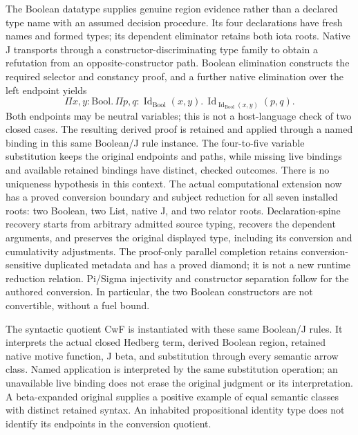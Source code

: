 \documentclass[11pt]{article}
\theoremstyle{definition}
\theoremstyle{remark}
\begin{document}
The Boolean datatype supplies genuine region evidence rather than a declared
type name with an assumed decision procedure. Its four declarations have fresh
names and formed types; its dependent eliminator retains both iota roots.
Native J transports through a constructor-discriminating type family to obtain
a refutation from an opposite-constructor path. Boolean elimination constructs
the required selector and constancy proof, and a further native elimination
over the left endpoint yields
\[
  \Pi x,y:\mathrm{Bool}.\,
  \Pi p,q:\operatorname{Id}_{\mathrm{Bool}}(x,y).\,
  \operatorname{Id}_{\operatorname{Id}_{\mathrm{Bool}}(x,y)}(p,q).
\]
Both endpoints may be neutral variables; this is not a host-language check
of two closed cases. The resulting derived proof is retained and applied
through a named binding in this same Boolean/J rule instance. The four-to-five
variable substitution keeps the original endpoints and paths, while missing
live bindings and available retained bindings have distinct, checked outcomes.
There is no uniqueness hypothesis in this context. The actual computational
extension now has a proved conversion boundary and subject reduction for all
seven installed roots: two Boolean, two List, native J, and two relator roots.
Declaration-spine recovery starts from arbitrary admitted source typing,
recovers the dependent arguments, and preserves the original displayed type,
including its conversion and cumulativity adjustments. The proof-only parallel
completion retains conversion-sensitive duplicated metadata and has a proved
diamond; it is not a new runtime reduction relation. Pi/Sigma injectivity and
constructor separation follow for the authored conversion. In particular,
the two Boolean constructors are not convertible, without a fuel bound.

The syntactic quotient CwF is instantiated with these same Boolean/J rules.
It interprets the actual closed Hedberg term, derived Boolean region, retained
native motive function, J beta, and substitution through every semantic arrow
class. Named application is interpreted by the same substitution operation;
an unavailable live binding does not erase the original judgment or its
interpretation. A beta-expanded original supplies a positive example of equal
semantic classes with distinct retained syntax. An inhabited propositional
identity type does not identify its endpoints in the conversion quotient.
\end{document}
